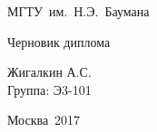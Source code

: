 \documentclass[a4paper,12pt]{article}
\begin{document}
    \begin{titlepage}

        \begin{center}
            \begin{Large}
            МГТУ\ им.\ Н.Э.\ Баумана\\
            \end{Large}
            \begin{large}
            \vspace{6cm}
            Черновик диплома\\
            \vfill
            \end{large}
        \end{center}

        \begin{flushright}
            \begin{large}
            Жигалкин А.С.\\
            Группа: Э3-101\\
            \vspace{2cm}
            \end{large}
        \end{flushright}

        \begin{large}
            \begin{center}
           Москва\ 2017
            \end{center}
        \end{large}

    \end{titlepage}


    \tableofcontents
    \newpage

\end{document}
